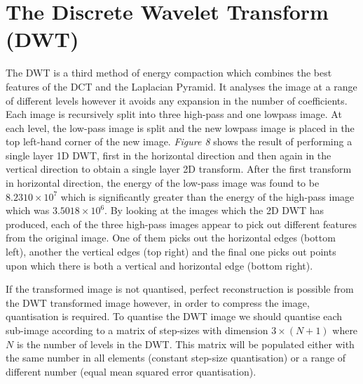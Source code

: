 \documentclass{article}					%
\begin{document}
\section{The Discrete Wavelet Transform (DWT)}
The DWT is a third method of energy compaction which combines the best features of the DCT and the Laplacian Pyramid. It analyses the image at a range of different levels however it avoids any expansion in the number of coefficients. Each image is recursively split into three high-pass and one lowpass image. At each level, the low-pass image is split and the new lowpass image is placed in the top left-hand corner of the new image. \textit{Figure 8} shows the result of performing a single layer 1D DWT, first in the horizontal direction and then again in the vertical direction to obtain a single layer 2D transform. After the first transform in horizontal direction, the energy of the low-pass image was found to be $8.2310\times 10^7$ which is significantly greater than the energy of the high-pass image which was $3.5018\times 10^6$. By looking at the images which the 2D DWT has produced, each of the three high-pass images appear to pick out different features from the original image. One of them picks out the horizontal edges (bottom left), another the vertical edges (top right) and the final one picks out points upon which there is both a vertical and horizontal edge (bottom right).

If the transformed image is not quantised, perfect reconstruction is possible from the DWT transformed image however, in order to compress the image, quantisation is required. To quantise the DWT image we should quantise each sub-image according to a matrix of step-sizes with dimension $3\times (N+1)$ where $N$ is the number of levels in the DWT. This matrix will be populated either with the same number in all elements (constant step-size quantisation) or a range of different number (equal mean squared error quantisation).
\end{document}
